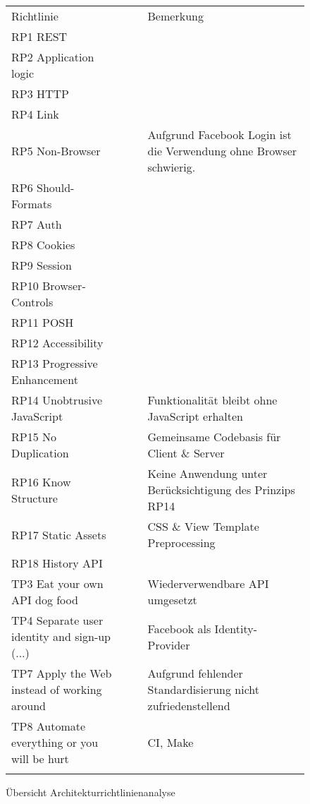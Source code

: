 \begin{figure}[H]
	\begin{table}[H]
		\tablestyle
		\tablealtcolored
		\begin{tabularx}{\textwidth}{l c c X}
			\tableheadcolor
				\tablehead Richtlinie &
				\tablehead\rotatebox{90}{Demonstriert\hspace{3mm}} &
				\tablehead\rotatebox{90}{Resultat} &
				\tablehead Bemerkung
				\tabularnewline
			\tablebody
				RP1	REST & \faOk & \faSmile & \tabularnewline
				RP2 Application logic & \faOk & \faSmile & \tabularnewline
				RP3 HTTP & \faOk & \faSmile & \tabularnewline
				RP4 Link & \faOk & \faSmile & \tabularnewline
				RP5 Non-Browser & \faOk & \faMeh & Aufgrund Facebook Login ist die Verwendung ohne Browser schwierig. \tabularnewline
				RP6 Should-Formats & \faOk & \faSmile & \tabularnewline
				RP7 Auth & & & \tabularnewline
				RP8 Cookies & & & \tabularnewline
				RP9 Session & & & \tabularnewline
				RP10 Browser-Controls & \faOk & \faSmile & \tabularnewline
				RP11 POSH & & & \tabularnewline
				RP12 Accessibility & & & \tabularnewline
				RP13 Progressive Enhancement & & & \tabularnewline
				RP14 Unobtrusive JavaScript & \faOk & \faSmile & Funktionalität bleibt ohne JavaScript erhalten\tabularnewline
				RP15 No Duplication & & & Gemeinsame Codebasis für Client \& Server\tabularnewline
				RP16 Know Structure & \faExclamation & \faFrown & Keine Anwendung unter Berücksichtigung des Prinzips RP14 \tabularnewline
				RP17 Static Assets & \faOk & \faSmile & CSS \& View Template Preprocessing\tabularnewline
				RP18 History API & \faOk & \faSmile & \tabularnewline
				TP3 Eat your own API dog food & \faOk & \faSmile & Wiederverwendbare API umgesetzt\tabularnewline
				TP4 Separate user identity and sign-up (...) & \faOk & \faSmile & Facebook als Identity-Provider\tabularnewline
				TP7 Apply the Web instead of working around & \faOk & \faMeh & Aufgrund fehlender Standardisierung nicht zufriedenstellend\tabularnewline
				TP8 Automate everything or you will be hurt & \faOk & \faSmile & \gls{CI}, Make\tabularnewline
			\tableend
		\end{tabularx}
	\end{table}
	\caption{Übersicht Architekturrichtlinienanalyse}
	\label{tab:overview-principle-demonstration}
\end{figure}



\newpage


